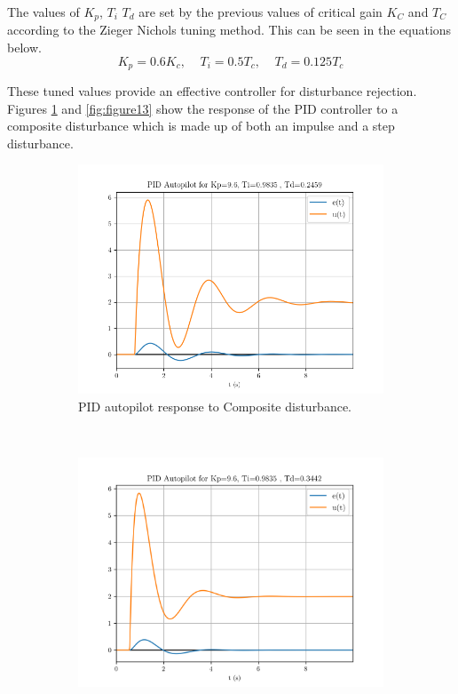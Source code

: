 \documentclass[8pt]{article}
\begin{document}
The values of $K_p$, $T_i$ $T_d$ are set by the previous values of critical gain $K_C$ and $T_C$ according to the Zieger Nichols tuning method. This can be seen in the equations below.
\begin{equation}
    K_p=0.6K_c, \;\;\;\; T_i=0.5T_c, \;\;\;\; T_d = 0.125T_c
\end{equation}

These tuned values provide an effective controller for disturbance rejection.
Figures \ref{fig:figure125} and \ref{fig:figure13} show the response of the PID controller to a composite disturbance which is made up of both an impulse and a step disturbance.

\begin{figure}[H]
    \centering
    \begin{subfigure}[t]{0.48\textwidth}
        \centering
        \includegraphics[width=1\textwidth]{figures/FIGURE_125.png}
        \caption{PID autopilot response to Composite disturbance.}
        \label{fig:figure125}
    \end{subfigure}
    ~
    \begin{subfigure}[t]{0.48\textwidth}
        \centering
        \includegraphics[width=1\textwidth]{figures/FIGURE_13.png}

\end{subfigure}
\end{figure}
\end{document}
